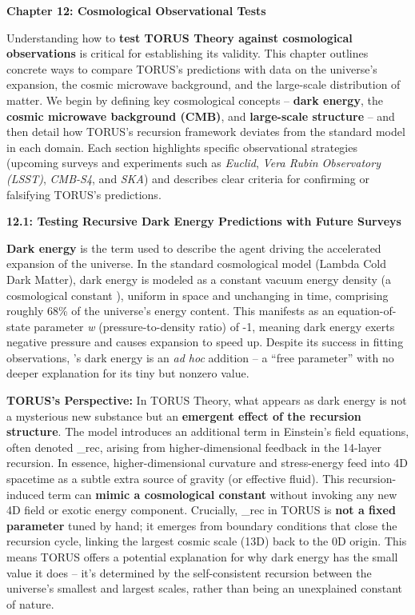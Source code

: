\documentclass[
]{article}
\begin{document}
{\textbf{Chapter 12: Cosmological Observational Tests}

Understanding how to \textbf{test TORUS Theory against cosmological
observations} is critical for establishing its validity. This chapter
outlines concrete ways to compare TORUS's predictions with data on the
universe's expansion, the cosmic microwave background, and the
large-scale distribution of matter. We begin by defining key
cosmological concepts -- \textbf{dark energy}, the \textbf{cosmic
microwave background (CMB)}, and \textbf{large-scale structure} -- and
then detail how TORUS's recursion framework deviates from the standard
\LambdaCDM model in each domain. Each section highlights specific
observational strategies (upcoming surveys and experiments such as
\emph{Euclid}, \emph{Vera Rubin Observatory (LSST)}, \emph{CMB-S4}, and
\emph{SKA}) and describes clear criteria for confirming or falsifying
TORUS's predictions.

\textbf{12.1: Testing Recursive Dark Energy Predictions with Future
Surveys}

\textbf{Dark energy} is the term used to describe the agent driving the
accelerated expansion of the universe. In the standard \textbf{\LambdaCDM}
cosmological model (Lambda Cold Dark Matter), dark energy is modeled as
a constant vacuum energy density (a cosmological constant \textbf{\Lambda}),
uniform in space and unchanging in time, comprising roughly 68\% of the
universe's energy content. This manifests as an equation-of-state
parameter \emph{w} (pressure-to-density ratio) of -1, meaning dark
energy exerts negative pressure and causes expansion to speed up.
Despite its success in fitting observations, \LambdaCDM's dark energy is an
\emph{ad hoc} addition -- a ``free parameter'' with no deeper
explanation for its tiny but nonzero value.

\textbf{TORUS's Perspective:} In TORUS Theory, what appears as dark
energy is not a mysterious new substance but an \textbf{emergent effect
of the recursion structure}. The model introduces an additional term in
Einstein's field equations, often denoted
\emph{\Lambda}_{rec}, arising
from higher-dimensional feedback in the 14-layer recursion\hspace{0pt}.
In essence, higher-dimensional curvature and stress-energy feed into 4D
spacetime as a subtle extra source of gravity (or effective
fluid)\hspace{0pt}. This recursion-induced term can \textbf{mimic a
cosmological constant} without invoking any new 4D field or exotic
energy component\hspace{0pt}. Crucially,
\emph{\Lambda}_{rec}{} in
TORUS is \textbf{not a fixed parameter} tuned by hand; it emerges from
boundary conditions that close the recursion cycle, linking the largest
cosmic scale (13D) back to the 0D origin\hspace{0pt}. This means TORUS
offers a potential explanation for why dark energy has the small value
it does -- it's determined by the self-consistent recursion between the
universe's smallest and largest scales, rather than being an unexplained
constant of nature.

}
\end{document}
